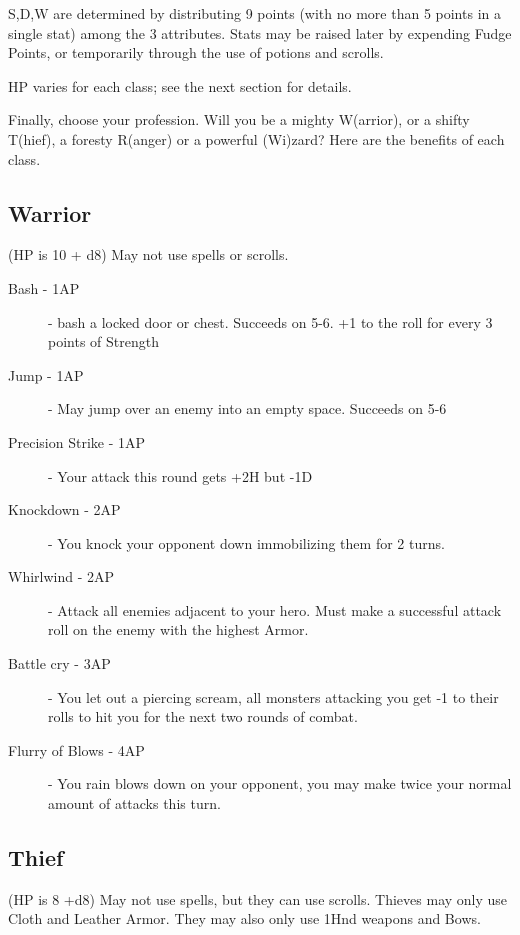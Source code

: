 \documentclass[a6paper,hidelinks]{article}
\begin{document}
S,D,W are determined by distributing 9 points (with no more than 5 points in a single stat) among the 3 attributes. Stats may be raised later by expending  Fudge Points, or temporarily through the use of potions and scrolls.

HP varies for each class; see the next section for details.

Finally, choose your profession. Will you be a mighty W(arrior), or a shifty T(hief), a foresty R(anger) or a powerful (Wi)zard? Here are the benefits of each class.

\subsection{Warrior}

(HP is 10 + d8) May not use spells or scrolls.

\begin{description}

\item[Bash - 1AP] - bash a locked door or chest. Succeeds on 5-6. +1 to the roll for every 3 points of Strength
\item[Jump - 1AP] - May jump over an enemy into an empty space. Succeeds on 5-6
\item[Precision Strike - 1AP] - Your attack this round gets +2H but -1D
\item[Knockdown - 2AP] - You knock your opponent down immobilizing them for 2 turns.
\item[Whirlwind - 2AP] - Attack all enemies adjacent to your hero. Must make a successful attack roll on the enemy with the highest Armor.
\item[Battle cry - 3AP] - You let out a piercing scream, all monsters attacking you get -1 to their rolls to hit you for the next two rounds of combat.
\item[Flurry of Blows - 4AP] - You rain blows down on your opponent, you may make twice your normal amount of attacks this turn.


\end{description}

\subsection{Thief}

(HP is 8 +d8) May not use spells, but they can use scrolls. Thieves may only use Cloth and Leather Armor. They may also only use 1Hnd weapons and Bows.
\end{document}

